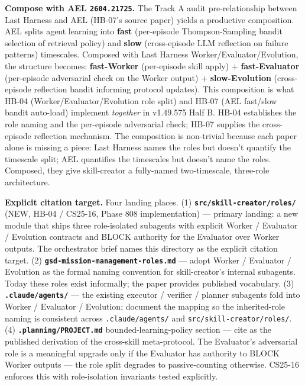 \documentclass[11pt,letterpaper]{article}
\newcommand{\arxivid}[1]{\texttt{\textcolor{accent}{#1}}}
\begin{document}
\textbf{Compose with AEL \arxivid{2604.21725}.} The Track A audit
pre-relationship between Last Harness and AEL (HB-07's source paper)
yields a productive composition. AEL splits agent learning into
\textbf{fast} (per-episode Thompson-Sampling bandit selection of
retrieval policy) and \textbf{slow} (cross-episode LLM reflection on
failure patterns) timescales. Composed with Last Harness
Worker/Evaluator/Evolution, the structure becomes: \textbf{fast-Worker}
(per-episode skill apply) + \textbf{fast-Evaluator} (per-episode
adversarial check on the Worker output) + \textbf{slow-Evolution}
(cross-episode reflection bandit informing protocol updates). This
composition is what HB-04 (Worker/Evaluator/Evolution role split) and
HB-07 (AEL fast/slow bandit auto-load) implement \emph{together} in
v1.49.575 Half B. HB-04 establishes the role naming and the per-episode
adversarial check; HB-07 supplies the cross-episode reflection
mechanism. The composition is non-trivial because each paper alone is
missing a piece: Last Harness names the roles but doesn't quantify the
timescale split; AEL quantifies the timescales but doesn't name the
roles. Composed, they give skill-creator a fully-named two-timescale,
three-role architecture.

\textbf{Explicit citation target.} Four landing places. (1)
\textbf{\texttt{src/skill-creator/roles/}} (NEW, HB-04 / CS25-16, Phase
808 implementation) --- primary landing: a new module that ships three
role-isolated subagents with explicit Worker / Evaluator / Evolution
contracts and BLOCK authority for the Evaluator over Worker outputs. The
orchestrator brief names this directory as the explicit citation target.
(2) \textbf{\texttt{gsd-mission-management-roles.md}} --- adopt Worker /
Evaluator / Evolution as the formal naming convention for
skill-creator's internal subagents. Today these roles exist informally;
the paper provides published vocabulary. (3)
\textbf{\texttt{.claude/agents/}} --- the existing executor / verifier /
planner subagents fold into Worker / Evaluator / Evolution; document the
mapping so the inherited-role naming is consistent across
\texttt{.claude/agents/} and \texttt{src/skill-creator/roles/}. (4)
\textbf{\texttt{.planning/PROJECT.md}} bounded-learning-policy section
--- cite as the published derivation of the cross-skill meta-protocol.
The Evaluator's adversarial role is a meaningful upgrade only if the
Evaluator has authority to BLOCK Worker outputs --- the role split
degrades to passive-counting otherwise. CS25-16 enforces this with
role-isolation invariants tested explicitly.
\end{document}
